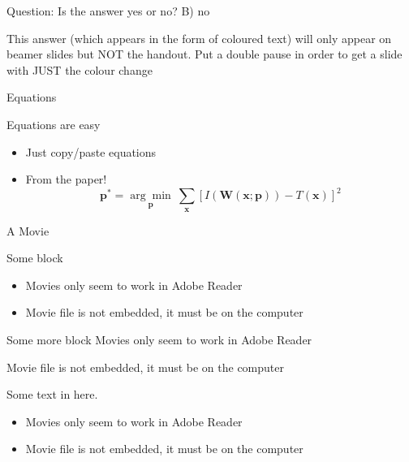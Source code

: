 \documentclass[xcolor=svgnames]{beamer}
\begin{document}
\begin{frame}
  \begin{exampleblock}{Question:}
Is the answer yes or no? {}   B) no
  \end{exampleblock} 
  \pause\pause
This answer (which appears in the form of coloured text) will only appear on beamer slides but NOT the handout. Put a double pause in order to get a slide with JUST the colour change
\end{frame}





\begin{frame}
  {Equations}

  Equations are easy
  \begin{itemize}
  \item Just copy/paste equations\pause
  \item From the paper!
    \begin{equation*}
      \textbf{p}^* = \underset{\textbf{p}}{\arg\!\min}~\sum_{\textbf{x}}\left[ I(\textbf{W}(\textbf{x};\textbf{p})) - T(\textbf{x}) \right]^2
    \end{equation*}
  \end{itemize}
\end{frame}





\begin{frame}
  {A Movie}

  \begin{block}{Some block}
    \begin{itemize}
    \item Movies only seem to work in Adobe Reader
    \item Movie file is not embedded, it must be on the computer
    \end{itemize}
  \end{block}

  \begin{exampleblock}{Some more block}
    Movies only seem to work in Adobe Reader\par
    Movie file is not embedded, it must be on the computer
  \end{exampleblock}

  \begin{alertblock}{}
    Some text in here.
    \begin{itemize}
    \item Movies only seem to work in Adobe Reader
    \item Movie file is not embedded, it must be on the computer
    \end{itemize}
  \end{alertblock}
\end{frame}
\end{document}
